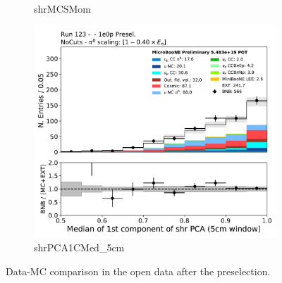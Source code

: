 \begin{figure}[H]
\begin{center}
\begin{subfigure}[b]{0.3\textwidth}
    \caption{\label{fig:1e0p:dataMCRun1:shr_tkfit_gap10_dedx_V} shrMCSMom }
    \end{subfigure}
    \begin{subfigure}[b]{0.3\textwidth}
    \centering
    \includegraphics[width=1.00\textwidth]{1e0p/dataMCRun123/shrPCA1CMed_5cm.pdf}
    \caption{\label{fig:1e0p:dataMCRun1:shr_tkfit_gap_dedx_Y} shrPCA1CMed\_5cm}
    \end{subfigure}
\caption{\label{fig:1e0p:dataMCRun1:shr_tkfit_dedx_2cm}Data-MC comparison in the open data after the \zpsel preselection.}
\end{center}
\end{figure}

